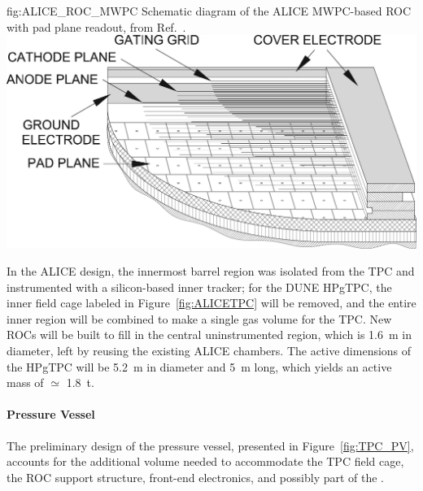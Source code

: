 \begin{dunefigure}{fig:ALICE_ROC_MWPC}
{Schematic diagram of the ALICE MWPC-based ROC with pad plane readout, from Ref.~\cite{Alme:2010ke}.}
    \includegraphics{graphics/TPC_ROC_MWPC.jpg}
\end{dunefigure}

In the ALICE design, the innermost barrel region was isolated from the TPC and instrumented with a silicon-based inner tracker; for the DUNE HPgTPC, the inner field cage labeled in Figure~\ref{fig:ALICETPC} will be removed, and the entire inner region will be combined to make a single gas volume for the TPC. New ROCs will be built to fill in the central uninstrumented region, which is \SI{1.6}{m} in diameter, left by reusing the existing ALICE chambers.  The active dimensions of the HPgTPC will be \SI{5.2}{m} in diameter and \SI{5}{m} long, which yields an active mass of $\simeq$ \SI{1.8}{t}. 


\paragraph{ Pressure Vessel}\label{sec:TPC_PV}

The preliminary design of the pressure vessel, presented in Figure~\ref{fig:TPC_PV}, accounts for the additional volume needed to accommodate the TPC field cage, the ROC support structure, front-end electronics, and possibly part of the .

